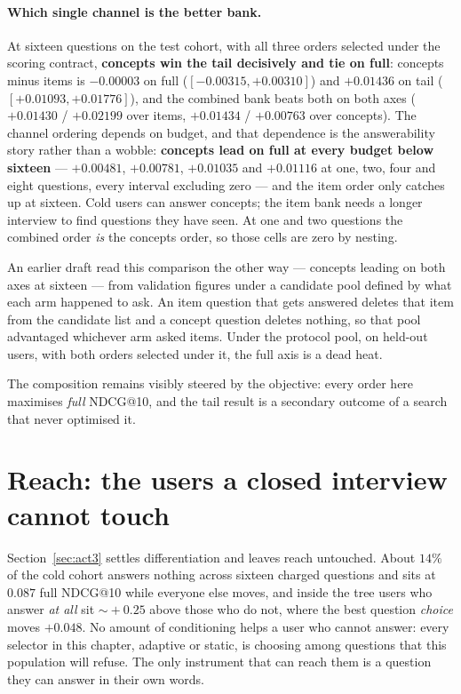 \documentclass[11pt]{article}
\begin{document}
\paragraph{Which single channel is the better bank.} At sixteen questions on the test cohort, with
all three orders selected under the scoring contract, \textbf{concepts win the tail decisively and
tie on full}: concepts minus items is $-0.00003$ on full ($[-0.00315,+0.00310]$) and $+0.01436$ on
tail ($[+0.01093,+0.01776]$), and the combined bank beats both on both axes ($+0.01430$ / $+0.02199$
over items, $+0.01434$ / $+0.00763$ over concepts). The channel ordering depends on budget, and that
dependence is the answerability story rather than a wobble: \textbf{concepts lead on full at every
budget below sixteen} --- $+0.00481$, $+0.00781$, $+0.01035$ and $+0.01116$ at one, two, four and
eight questions, every interval excluding zero --- and the item order only catches up at sixteen. Cold users can answer
concepts; the item bank needs a longer interview to find questions they have seen. At one and two
questions the combined order \emph{is} the concepts order, so those cells are zero by nesting.

An earlier draft read this comparison the other way --- concepts leading on both axes at sixteen ---
from validation figures under a candidate pool defined by what each arm happened to ask. An item
question that gets answered deletes that item from the candidate list and a concept question deletes
nothing, so that pool advantaged whichever arm asked items. Under the protocol pool, on held-out
users, with both orders selected under it, the full axis is a dead heat.

The composition remains visibly steered by the objective: every order here maximises \emph{full}
NDCG@10, and the tail result is a secondary outcome of a search that never optimised it.

\section{Reach: the users a closed interview cannot touch}
\label{sec:act5}

Section~\ref{sec:act3} settles differentiation and leaves reach untouched. About $14\%$ of the cold cohort answers
nothing across sixteen charged questions and sits at $0.087$ full NDCG@10 while everyone else moves,
and inside the tree users who answer \emph{at all} sit $\sim\!+0.25$ above those who do not, where
the best question \emph{choice} moves $+0.048$. No amount of conditioning helps a user who cannot answer: every
selector in this chapter, adaptive or static, is choosing among questions that this population will
refuse. The only instrument that can reach them is a question they can answer in their own words.
\end{document}

